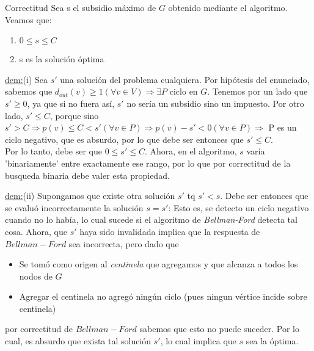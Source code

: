 \begin{subsection}{Correctitud}
Sea s el subsidio m\'{a}ximo de $G$ obtenido mediante el algoritmo. Veamos que:
\begin{enumerate}[label=(\roman*)]
	\item{$0 \leq s \leq C$}
    \item{s es la soluci\'{o}n \'{o}ptima}
\end{enumerate}

\underline{dem:}(i) Sea $s'$ una soluci\'{o}n del problema cualquiera. Por hip\'{o}tesis del enunciado, sabemos que ${d_{out}}(v)\geq 1 (\forall v \in V) \Rightarrow \exists P \text{ ciclo en } G$. 
Tenemos por un lado que $s' \geq 0$, ya que si no fuera as\'{i}, $s'$ no ser\'{i}a un subsidio sino un impuesto. Por otro lado, $s' \leq C$, porque sino $s'>C 
\Rightarrow p(v) \leq C < s' (\forall v \in P) \Rightarrow p(v) - s' < 0 (\forall v \in P) \Rightarrow $ P es un ciclo negativo, que es absurdo, por lo que debe ser entonces que $s' \leq C$. \\
Por lo tanto, debe ser que $0 \leq s' \leq C$. Ahora, en el algoritmo, $s$ var\'{i}a 'binariamente' entre exactamente ese rango, por lo que por correctitud de la busqueda binaria debe valer esta propiedad.

\underline{dem:}(ii) Supongamos que existe otra soluci\'{o}n $s'$ tq $s'<s$. Debe ser entonces que se evalu\'{o} incorrectamente la soluci\'{o}n $s=s'$: Esto es, se detecto un ciclo negativo cuando no lo hab\'{i}a, lo cual sucede si el algoritmo de \textit{Bellman-Ford} detecta tal cosa. Ahora, que $s'$ haya sido invalidada implica que  la respuesta de $Bellman-Ford$ sea incorrecta, pero dado que
  \begin{itemize}
  	\item{Se tom\'{o} como origen al \textit{centinela} que agregamos y que alcanza a todos los nodos de $G$}
      \item{Agregar el centinela no agreg\'{o} ning\'{u}n ciclo (pues ningun v\'{e}rtice incide sobre centinela)}
  \end{itemize}
por correctitud de $Bellman-Ford$ sabemos que esto no puede suceder. Por lo cual, es absurdo que exista tal soluci\'{o}n $s'$, lo cual implica que $s$ sea la \'{o}ptima.
\end{subsection}

